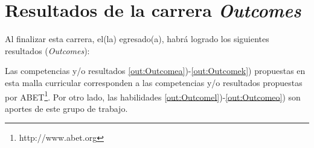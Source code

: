\section{Resultados de la carrera {\it Outcomes}}\label{sec:outcomes}
Al finalizar esta carrera, el(la) egresado(a), habrá  logrado los siguientes resultados ({\it Outcomes}):



Las competencias y/o resultados \ref{out:Outcomea})-\ref{out:Outcomek}) propuestas en esta malla curricular corresponden a las 
competencias y/o resultados propuestas por ABET\footnote{http://www.abet.org}.
Por otro lado, las habilidades \ref{out:Outcomel})-\ref{out:Outcomeo}) son aportes de este grupo de trabajo.
